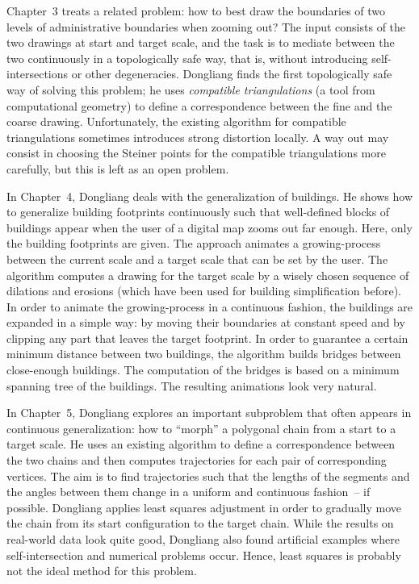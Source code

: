 {  Chapter~3 treats a related problem: how to best draw the boundaries
  of two levels of administrative boundaries when zooming out?  The
  input consists of the two drawings at start and target scale, and
  the task is to mediate between the two continuously in a
  topologically safe way, that is, without introducing
  self-intersections or other degeneracies.  Dongliang finds the first
  topologically safe way of solving this problem; he uses
  \emph{compatible triangulations} (a tool from computational
  geometry) to define a correspondence between the fine and the coarse
  drawing.  Unfortunately, the existing algorithm for compatible
  triangulations sometimes introduces strong distortion locally.  A
  way out may consist in choosing the Steiner points for the
  compatible triangulations more carefully, but this is left as an
  open problem.

  In Chapter~4, Dongliang deals with the generalization of buildings.
  He shows how to generalize building footprints continuously such
  that well-defined blocks of buildings appear when the user of a
  digital map zooms out far enough.  Here, only the building
  footprints are given.  The approach animates a growing-process
  between the current scale and a target scale that can be set by the
  user.  The algorithm computes a drawing for the target scale by a
  wisely chosen sequence of dilations and erosions (which have been
  used for building simplification before).  In order to animate the
  growing-process in a continuous fashion, the buildings are expanded
  in a simple way: by moving their boundaries at constant speed and by
  clipping any part that leaves the target footprint.  In order to
  guarantee a certain minimum distance between two buildings, the
  algorithm builds bridges between close-enough buildings.  The
  computation of the bridges is based on a minimum spanning tree of
  the buildings.  The resulting animations look very natural.

  In Chapter~5, Dongliang explores an important subproblem that often
  appears in continuous generalization: how to ``morph'' a polygonal
  chain from a start to a target scale.  He uses an existing algorithm
  to define a correspondence between the two chains and then computes
  trajectories for each pair of corresponding vertices.  The aim is to
  find trajectories such that the lengths of the segments and the
  angles between them change in a uniform and continuous fashion~-- if
  possible.  Dongliang applies least squares adjustment in order to
  gradually move the chain from its start configuration to the target
  chain.  While the results on real-world data look quite good,
  Dongliang also found artificial examples where self-intersection and
  numerical problems occur.  Hence, least squares is probably not the
  ideal method for this problem.

}
